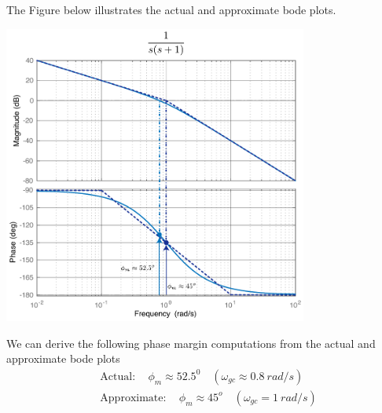 \documentclass[twoside]{article}
\begin{document}
The Figure below illustrates the actual and approximate bode plots.

\begin{minipage}[h]{1\linewidth}
    \begin{center}
      \includegraphics[width=0.75\textwidth]{type1}
    \end{center}
\end{minipage}

We can derive the following phase margin computations from the
actual and approximate bode plots
%
%
\begin{align*}
	&\mathrm{Actual:} \quad \phi_m \approx 52.5^0 \quad (\omega_{gc} \approx 0.8 \ rad/s)
	\\
	&\mathrm{Approximate:} \quad \phi_m \approx 45^o \quad (\omega_{gc} = 1 \ rad/s)
\end{align*}
%



\end{document}
